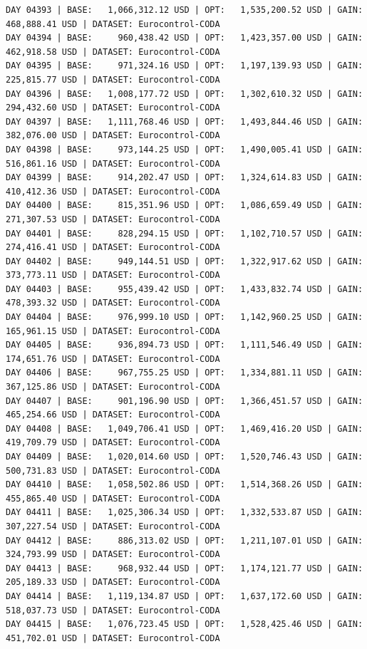 \documentclass[11pt,a4paper]{article}
\begin{document}
\begin{verbatim}
DAY 04393 | BASE:   1,066,312.12 USD | OPT:   1,535,200.52 USD | GAIN: 468,888.41 USD | DATASET: Eurocontrol-CODA
DAY 04394 | BASE:     960,438.42 USD | OPT:   1,423,357.00 USD | GAIN: 462,918.58 USD | DATASET: Eurocontrol-CODA
DAY 04395 | BASE:     971,324.16 USD | OPT:   1,197,139.93 USD | GAIN: 225,815.77 USD | DATASET: Eurocontrol-CODA
DAY 04396 | BASE:   1,008,177.72 USD | OPT:   1,302,610.32 USD | GAIN: 294,432.60 USD | DATASET: Eurocontrol-CODA
DAY 04397 | BASE:   1,111,768.46 USD | OPT:   1,493,844.46 USD | GAIN: 382,076.00 USD | DATASET: Eurocontrol-CODA
DAY 04398 | BASE:     973,144.25 USD | OPT:   1,490,005.41 USD | GAIN: 516,861.16 USD | DATASET: Eurocontrol-CODA
DAY 04399 | BASE:     914,202.47 USD | OPT:   1,324,614.83 USD | GAIN: 410,412.36 USD | DATASET: Eurocontrol-CODA
DAY 04400 | BASE:     815,351.96 USD | OPT:   1,086,659.49 USD | GAIN: 271,307.53 USD | DATASET: Eurocontrol-CODA
DAY 04401 | BASE:     828,294.15 USD | OPT:   1,102,710.57 USD | GAIN: 274,416.41 USD | DATASET: Eurocontrol-CODA
DAY 04402 | BASE:     949,144.51 USD | OPT:   1,322,917.62 USD | GAIN: 373,773.11 USD | DATASET: Eurocontrol-CODA
DAY 04403 | BASE:     955,439.42 USD | OPT:   1,433,832.74 USD | GAIN: 478,393.32 USD | DATASET: Eurocontrol-CODA
DAY 04404 | BASE:     976,999.10 USD | OPT:   1,142,960.25 USD | GAIN: 165,961.15 USD | DATASET: Eurocontrol-CODA
DAY 04405 | BASE:     936,894.73 USD | OPT:   1,111,546.49 USD | GAIN: 174,651.76 USD | DATASET: Eurocontrol-CODA
DAY 04406 | BASE:     967,755.25 USD | OPT:   1,334,881.11 USD | GAIN: 367,125.86 USD | DATASET: Eurocontrol-CODA
DAY 04407 | BASE:     901,196.90 USD | OPT:   1,366,451.57 USD | GAIN: 465,254.66 USD | DATASET: Eurocontrol-CODA
DAY 04408 | BASE:   1,049,706.41 USD | OPT:   1,469,416.20 USD | GAIN: 419,709.79 USD | DATASET: Eurocontrol-CODA
DAY 04409 | BASE:   1,020,014.60 USD | OPT:   1,520,746.43 USD | GAIN: 500,731.83 USD | DATASET: Eurocontrol-CODA
DAY 04410 | BASE:   1,058,502.86 USD | OPT:   1,514,368.26 USD | GAIN: 455,865.40 USD | DATASET: Eurocontrol-CODA
DAY 04411 | BASE:   1,025,306.34 USD | OPT:   1,332,533.87 USD | GAIN: 307,227.54 USD | DATASET: Eurocontrol-CODA
DAY 04412 | BASE:     886,313.02 USD | OPT:   1,211,107.01 USD | GAIN: 324,793.99 USD | DATASET: Eurocontrol-CODA
DAY 04413 | BASE:     968,932.44 USD | OPT:   1,174,121.77 USD | GAIN: 205,189.33 USD | DATASET: Eurocontrol-CODA
DAY 04414 | BASE:   1,119,134.87 USD | OPT:   1,637,172.60 USD | GAIN: 518,037.73 USD | DATASET: Eurocontrol-CODA
DAY 04415 | BASE:   1,076,723.45 USD | OPT:   1,528,425.46 USD | GAIN: 451,702.01 USD | DATASET: Eurocontrol-CODA

\end{verbatim}
\end{document}
